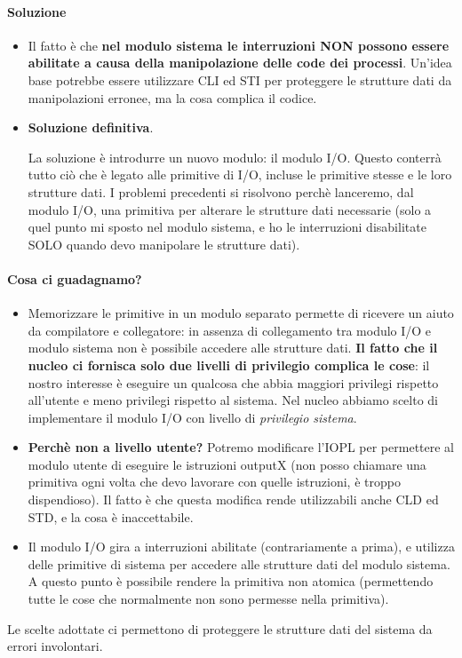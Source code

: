 \documentclass[11pt]{report}
\theoremstyle{definition}
\begin{document}
\paragraph{Soluzione} 
\begin{itemize}
	\item Il fatto è che \textbf{nel modulo sistema le interruzioni NON possono essere abilitate a causa della manipolazione delle code dei processi}. Un'idea base potrebbe essere utilizzare CLI ed STI per proteggere le strutture dati da manipolazioni erronee, ma la cosa complica il codice.
	\item \textbf{Soluzione definitiva}. 
	
	La soluzione è introdurre un nuovo modulo: il modulo I/O. Questo conterrà tutto ciò che è legato alle primitive di I/O, incluse le primitive stesse e le loro strutture dati. I problemi precedenti si risolvono perchè lanceremo, dal modulo I/O, una primitiva per alterare le strutture dati necessarie (solo a quel punto mi sposto nel modulo sistema, e ho le interruzioni disabilitate SOLO quando devo manipolare le strutture dati).
\end{itemize}
\paragraph{Cosa ci guadagnamo?}
\begin{itemize}
	\item Memorizzare le primitive in un modulo separato permette di ricevere un aiuto da compilatore e collegatore: in assenza di collegamento tra modulo I/O e modulo sistema non è possibile accedere alle strutture dati. \textbf{Il fatto che il nucleo ci fornisca solo due livelli di privilegio complica le cose}: il nostro interesse è eseguire un qualcosa che abbia maggiori privilegi rispetto all'utente e meno privilegi rispetto al sistema. Nel nucleo abbiamo scelto di implementare il modulo I/O con livello di \textit{privilegio sistema}. 
	\item \textbf{Perchè non a livello utente?} Potremo modificare l'IOPL per permettere al modulo utente di eseguire le istruzioni outputX (non posso chiamare una primitiva ogni volta che devo lavorare con quelle istruzioni, è troppo dispendioso). Il fatto è che questa modifica rende utilizzabili anche CLD ed STD, e la cosa è inaccettabile.
	\item Il modulo I/O gira a interruzioni abilitate (contrariamente a prima), e utilizza delle primitive di sistema per accedere alle strutture dati del modulo sistema. A questo punto è possibile rendere la primitiva non atomica (permettendo tutte le cose che normalmente non sono permesse nella primitiva). 
\end{itemize}
Le scelte adottate ci permettono di proteggere le strutture dati del sistema da errori involontari. 
\end{document}

